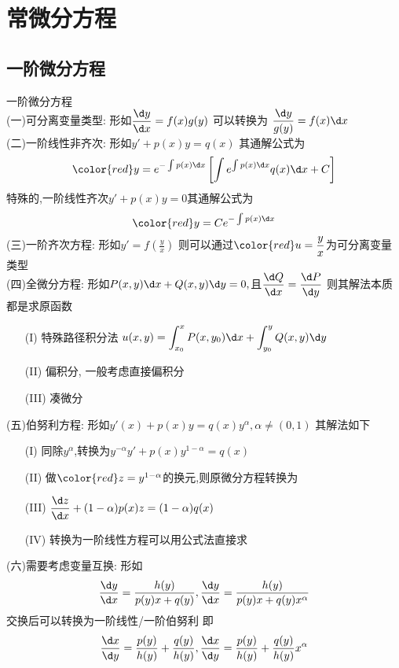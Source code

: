 \documentclass[12pt, a4paper, oneside, UTF8]{ctexbook}
\begin{document}

\else
\fi

\chapter{常微分方程}
\section{一阶微分方程}
\begin{remark}
    一阶微分方程 \\
    (一)可分离变量类型: 形如$\displaystyle\frac{\d y}{\d x}=f(x)g(y)$ 可以转换为 $\displaystyle \frac{\d y}{g(y)}=f(x)\d x$ \\
    (二)一阶线性非齐次: 形如$y'+p(x)y=q(x)$ 其通解公式为
    $$
    \color{red}
    y=e^{-\int p(x)\d x}\left[\int e^{\int p(x)\d x}q(x)\d x + C\right]
    $$
    特殊的,一阶线性齐次$y'+p(x)y=0$其通解公式为
    $$
    \color{red}
    y=Ce^{-\int p(x)\d x}
    $$
    (三)一阶齐次方程: 形如$\displaystyle y' = f(\frac{y}{x})$ 则可以通过${\displaystyle\color{red}u=\frac{y}{x}}$为可分离变量类型 \\
    (四)全微分方程: 形如$P(x,y)\d x + Q(x,y)\d y = 0,$且$\displaystyle \frac{\d Q}{\d x}=\frac{\d P}{\d y}$ 则其解法本质都是求原函数 
    \begin{enumerate}
        \item [(I)] 特殊路径积分法 $\displaystyle u(x,y)=\int_{x_0}^{x}P(x,y_0)\d x + \int_{y_0}^{y}Q(x,y)\d y$ 
        \item [(II)] {\color{red} 偏积分, 一般考虑直接偏积分}
        \item [(III)] 凑微分
    \end{enumerate}
    (五)伯努利方程: 形如$y'(x)+p(x)y=q(x)y^{\alpha},\alpha\neq (0, 1)$ 其解法如下 
    \begin{enumerate}
        \item [(I)] 同除$y^{\alpha}$,转换为$y^{-\alpha}y'+p(x)y^{1-\alpha}=q(x)$
        \item [(II)] 做$\color{red}z=y^{1-\alpha}$的换元,则原微分方程转换为 
        \item [(III)] $\displaystyle \frac{\d z}{\d x} + (1-\alpha)p(x)z=(1-\alpha)q(x)$ 
        \item [(IV)] 转换为一阶线性方程可以用公式法直接求
    \end{enumerate}
    (六)需要考虑变量互换: 形如
    $$
    \frac{\d y}{\d x} = \frac{h(y)}{p(y)x + q(y)}, \frac{\d y}{\d x}=\frac{h(y)}{p(y)x+q(y)x^{\alpha}}
    $$
    交换后可以转换为一阶线性/一阶伯努利 即
    $$
    \frac{\d x}{\d y} = \frac{p(y)}{h(y)} + \frac{q(y)}{h(y)}, \frac{\d x}{\d y} = \frac{p(y)}{h(y)} + \frac{q(y)}{h(y)}x^{\alpha}
    $$
\end{remark}
\end{document}
